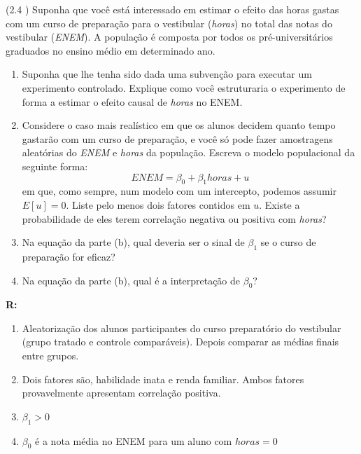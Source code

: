 \documentclass[12pt,letterpaper, onecolumn]{exam}
\renewenvironment{solution}
  {\par\noindent\textbf{R:}\enspace\color{blue}}
  {\par\color{black}}
\begin{document}
\begin{questions}
\question (2.4 \citep{wooldridge2010}) Suponha que você está interessado em estimar o efeito das horas gastas com um curso de preparação para o vestibular (\textit{horas}) no total das notas do vestibular (\textit{ENEM}). A população é composta por todos os pré-universitários graduados no ensino médio em determinado ano.
    \begin{enumerate} [label = (\alph*)]
\item Suponha que lhe tenha sido dada uma subvenção para executar um experimento controlado. Explique como você estruturaria o experimento de forma a estimar o efeito causal de \textit{horas} no ENEM.
\item Considere o caso mais realístico em que os alunos decidem quanto tempo gastarão com um curso de preparação, e você só pode fazer amostragens aleatórias do \textit{ENEM} e \textit{horas} da população. Escreva o modelo populacional da seguinte forma:\begin{equation*}
    ENEM = \beta_0 + \beta_1 horas + u
\end{equation*} em que, como sempre, num modelo com um intercepto, podemos assumir $E[u] = 0$. Liste pelo menos dois fatores contidos em $u$. Existe a probabilidade de eles terem correlação negativa ou positiva com \textit{horas}?
\item Na equação da parte (b), qual deveria ser o sinal de $\beta_1$ se o curso de preparação for eficaz?
\item Na equação da parte (b), qual é a interpretação de $\beta_0$?
    \end{enumerate}
\begin{solution}
    \begin{enumerate} [label = (\alph*)]
        \item Aleatorização dos alunos participantes do curso preparatório do vestibular (grupo tratado e controle comparáveis). Depois comparar as médias finais entre grupos.
        \item Dois fatores são, habilidade inata e renda familiar. Ambos fatores provavelmente apresentam correlação positiva.
        \item $\beta_1 > 0$
        \item $\beta_0$ é a nota média no ENEM para um aluno com $horas = 0$
        
    \end{enumerate}
\end{solution}
    
\end{questions}

\end{document}
